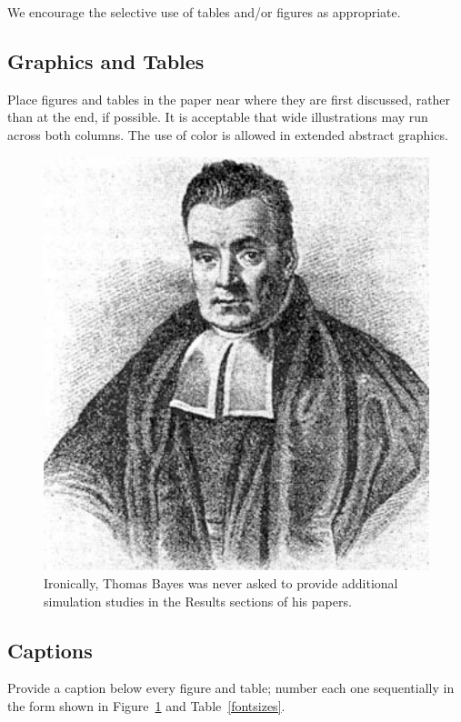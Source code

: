 \documentclass[10pt]{article}
\begin{document}
We encourage the selective use of tables and/or figures as appropriate.

\subsection{Graphics and Tables}

Place figures and tables in the
paper near where they are first discussed, rather than at the end, if
possible.  It is acceptable that wide illustrations
may run across both columns.  The use of color
is allowed in extended abstract graphics.

\begin{figure}[ht]
\begin{center}
\centerline{\includegraphics[width=\columnwidth]{bayes}}
\caption{Ironically, Thomas Bayes was never asked to provide additional
simulation studies in the Results sections of his papers.}
\label{bayespic}
\end{center}
\end{figure}

\subsection{Captions}
Provide a caption below every figure and table; number each one
sequentially in the form shown in Figure~\ref{bayespic} and
Table~\ref{fontsizes}.
\end{document}
